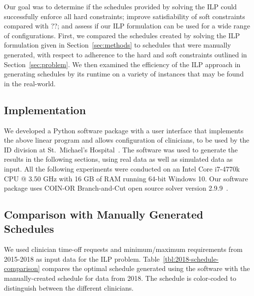 Our goal was to determine if the schedules provided by solving the ILP 
could successfully
enforce all hard constraints; improve satisfiability of soft constraints compared with ??; %
and assess if our ILP formulation can be used for a wide range
of configurations.  %
First, we compared the schedules created by solving the ILP formulation
given in Section~\ref{sec:methods} to schedules that were manually generated,
with respect to adherence to the hard and soft constraints outlined in Section~\ref{sec:problem}.
We then examined the efficiency of the ILP approach in generating schedules
by its runtime on a variety of instances that may be found in the real-world.


\subsection{Implementation}
We developed a Python software package with a user interface that implements the above
linear program and allows configuration of clinicians, to be
used by the ID division at St.\ Michael's Hospital~\cite{landsman_scheduling}. 
The software was used to
generate the results in the following sections, using real data as well as
simulated data as input. All the following experiments were conducted on an
Intel Core i7-4770k CPU @ 3.50 GHz with 16 GB of RAM running 64-bit Windows 10.
Our software package uses COIN-OR Branch-and-Cut open source solver
version 2.9.9~\cite{johnjforrest_coin-or/cbc:_2019}.

\subsection{Comparison with Manually Generated Schedules}  %
We used clinician time-off requests and minimum/maximum requirements from
2015-2018 as input data for the ILP problem.
Table~\ref{tbl:2018-schedule-comparison} compares the optimal schedule generated using
the software with the manually-created schedule for data from 2018. The
schedule is color-coded to distinguish between the different clinicians.

